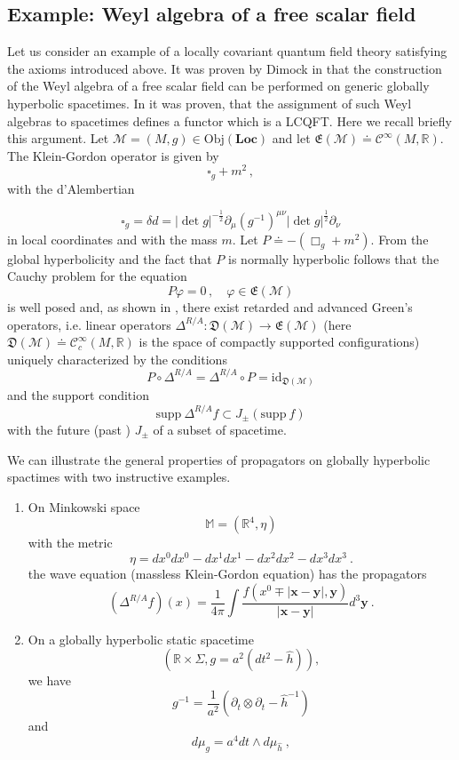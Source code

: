 \documentclass[12pt]{article}
\newcommand{\E}{\mathfrak{E}}
\newcommand{\D}{\mathfrak{D}}
\newcommand{\Mcal}{\mathcal{M}}
\newcommand{\Ci}{\mathcal{C}^\infty} %
\newcommand{\obj}{\mathrm{Obj}}
\newcommand{\Loc}{\mathrm{\mathbf{Loc}}}       %
\newcommand{\RR}{\mathbb{R}}           %
\newcommand{\ph}{\varphi}
\newcommand{\1}{\mathds{1}}                         %
\begin{document}
\subsection{Example: Weyl algebra of a free scalar field}\label{freescalar}
Let us consider an example of a locally covariant quantum field theory satisfying the axioms introduced above. It was proven by Dimock in \cite{Dim} that the construction of the Weyl algebra of a free scalar field can be performed on generic globally hyperbolic spacetimes. In \cite{BFV} it was proven, that the assignment of such Weyl algebras to spacetimes defines a functor which is a LCQFT. Here we recall briefly this argument. Let $\Mcal=(M,g)\in\obj(\Loc)$ and let $\E(\Mcal)\doteq\Ci(M,\RR)$. The Klein-Gordon operator  is given by
\[
\square_g+m^2\,,
\]
with the d'Alembertian
{\[\square_g=\delta d=|\det{g}|^{-\frac12}\partial_{\mu}(g^{-1})^{\mu\nu}|\det{g}|^{\frac12}\partial_{\nu}\]
in local coordinates and with the mass $m$.  Let $P\doteq -(\Box_g+m^2)$. From the global hyperbolicity and the fact that $P$ is normally hyperbolic follows that the Cauchy problem for the equation 
\[
P\ph=0\,,\quad \ph\in\mathfrak{E}(\mathcal{M})
\]
is well posed and, as shown in \cite{Baer}, there exist retarded and advanced Green's operators, i.e. linear operators  $\Delta^{R/A}:\D(\Mcal)\rightarrow\E(\Mcal)$ (here $\D(\Mcal)\doteq\Ci_c(M,\RR)$ is the space of compactly supported configurations)  uniquely characterized by the conditions
\[P\circ \Delta^{R/A}=\Delta^{R/A}\circ P=\mathrm{id}_{\mathfrak{D}(\mathcal{M})}\]
and the support condition
\[\mathrm{supp} \ \Delta^{R/A}f\subset J_{\pm}(\mathrm{supp} \  f)\]
with the future (past ) $J_{\pm}$ of a subset of spacetime. 
\begin{exa}
We can illustrate the general properties of propagators on globally hyperbolic spactimes with two instructive examples.
\begin{enumerate}
\item
On Minkowski space
\[\mathbb{M}=(\RR^4,\eta)\]
with the metric
\[\eta=dx^0dx^0-dx^1dx^1-dx^2dx^2-dx^3dx^3 \ .\]
the wave equation (massless Klein-Gordon equation) has the propagators
\[(\Delta^{R/A}f)(x)=\frac{1}{4\pi}\int \frac{f(x^0\mp |\mathbf x-\mathbf y|,\mathbf y)}{|\mathbf x-\mathbf y|}d^3\mathbf y \ .\]
\item
On a globally hyperbolic static spacetime 
\[(\RR\times\Sigma, g=a^2(dt^2-\hat{h})),\] 
we have 
\[g^{-1}=\frac{1}{a^2}(\partial_t\otimes\partial_t-\hat{h}^{-1})\] 
and
\[d\mu_g=a^4dt\wedge d\mu_{\hat{h}}\ ,\]

\end{enumerate}
\end{exa}}
\end{document}
